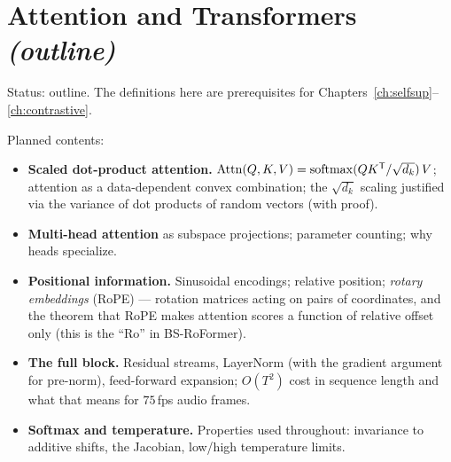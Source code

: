 \chapter{Attention and Transformers \emph{(outline)}}\label{ch:attention}

\begin{incode}
Status: outline. The definitions here are prerequisites for
Chapters~\ref{ch:selfsup}--\ref{ch:contrastive}.
\end{incode}

Planned contents:
\begin{itemize}
  \item \textbf{Scaled dot-product attention.}
  $\operatorname{Attn}(Q,K,V) = \operatorname{softmax}(QK^{\mathsf{T}}/\sqrt{d_k})\,V$; attention as
  a data-dependent convex combination; the $\sqrt{d_k}$ scaling justified via
  the variance of dot products of random vectors (with proof).
  \item \textbf{Multi-head attention} as subspace projections; parameter
  counting; why heads specialize.
  \item \textbf{Positional information.} Sinusoidal encodings; relative
  position; \emph{rotary embeddings} (RoPE) --- rotation matrices acting on
  pairs of coordinates, and the theorem that RoPE makes attention scores a
  function of relative offset only (this is the ``Ro'' in BS-RoFormer).
  \item \textbf{The full block.} Residual streams, LayerNorm (with the
  gradient argument for pre-norm), feed-forward expansion; $O(T^2)$ cost in
  sequence length and what that means for $75$\,fps audio frames.
  \item \textbf{Softmax and temperature.} Properties used throughout:
  invariance to additive shifts, the Jacobian, low/high temperature limits.
\end{itemize}
